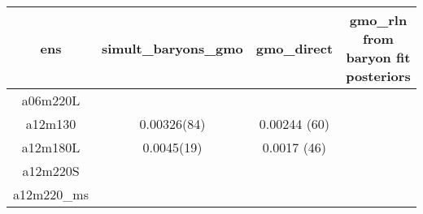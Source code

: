 \documentclass{article}
\begin{document}
\begin{table}[h!]
  \centering
 \setlength{\arrayrulewidth}{0.5mm}
\setlength{\tabcolsep}{13pt}
\renewcommand{\arraystretch}{2}
 \begin{tabular}{|| c |c | c | c ||} 
 
 \hline
 ens & simult\_baryons\_gmo & gmo\_direct & gmo\_rln from baryon fit posteriors  \\ [0.8ex] 
 \hline\hline
 a06m220L 
  & {}   &   {} & {}  \\
 \hline
 a12m130 
  & {0.00326(84)}   &   {0.00244 (60)} & {}  \\
 \hline
 a12m180L
  & {0.0045(19)}   &   {0.0017 (46)} & {}  \\
 \hline
 a12m220S
  & {}   &   {} & {}  \\
  \hline
 a12m220_{ms}
  & {}   &   {} & {}  \\
 \end{tabular}
 \end{table}
\newpage
\end{document}
